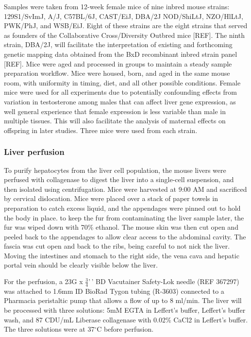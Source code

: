 \documentclass[10pt,letterpaper]{article}
\begin{document}
Samples were taken from 12-week female mice of nine inbred mouse
strains: 129S1/SvImJ, A/J, C57BL/6J, CAST/EiJ, DBA/2J NOD/ShiLtJ,
NZO/HlLtJ, PWK/PhJ, and WSB/EiJ. Eight of these strains are the eight
strains that served as founders of the Collaborative Cross/Diversity
Outbred mice {[}REF{]}. The ninth strain, DBA/2J, will facilitate the
interpretation of existing and forthcoming genetic mapping data obtained
from the BxD recombinant inbred strain panel {[}REF{]}. Mice were aged
and processed in groups to maintain a steady sample preparation
workflow. Mice were housed, born, and aged in the same mouse room, with
uniformity in timing, diet, and all other possible conditions. Female
mice were used for all experiments due to potentially confounding
effects from variation in testosterone among males that can affect liver
gene expression, as well general experience that female expression is
less variable than male in multiple tissues. This will also facilitate
the analysis of maternal effects on offspring in later studies. Three
mice were used from each strain.

\hypertarget{liver-perfusion}{%
\subsubsection{Liver perfusion}\label{liver-perfusion}}

To purify hepatocytes from the liver cell population, the mouse livers
were perfused with collagenase to digest the liver into a single-cell
suspension, and then isolated using centrifugation. Mice were harvested
at 9:00 AM and sacrificed by cervical dislocation. Mice were placed over
a stack of paper towels in preparation to catch excess liquid, and the
appendages were pinned out to hold the body in place. to keep the fur
from contaminating the liver sample later, the fur was wiped down with
70\% ethanol. The mouse skin was then cut open and peeled back to the
appendages to allow clear access to the abdominal cavity. The fascia was
cut open and back to the ribs, being careful to not nick the liver.
Moving the intestines and stomach to the right side, the vena cava and
hepatic portal vein should be clearly visible below the liver.

For the perfusion, a 23G x \(\frac{3}{4}\)'\,' BD Vacutainer Safety-Lok
needle (REF 367297) was attached to 1.6mm ID BioRad Tygon tubing
(R-3603) connected to a Pharmacia peristaltic pump that allows a flow of
up to 8 ml/min. The liver will be processed with three solutions: 5mM
EGTA in Leffert's buffer, Leffert's buffer wash, and 87 CDU/mL Liberase
collagenase with 0.02\% CaCl2 in Leffert's buffer. The three solutions
were at 37\(^{\circ}\)C before perfusion.
\end{document}
